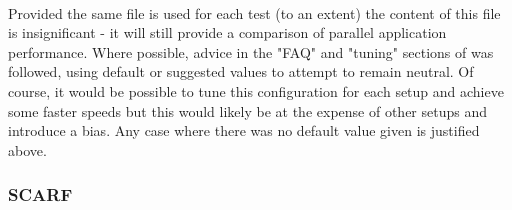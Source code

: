 \documentclass{article}
\begin{document}
            \paragraph{}
            Provided the same file is used for each test (to an extent) the content of this file is insignificant - it will still provide a comparison of parallel application performance. Where possible, advice in the "FAQ" and "tuning" sections of \cite{hpl2016} was followed, using default or suggested values to attempt to remain neutral. Of course, it would be possible to tune this configuration for each setup and achieve some faster speeds but this would likely be at the expense of other setups and introduce a bias. Any case where there was no default value given is justified above.



        \subsubsection{SCARF}
        \label{running-HPL-SCARF}
\end{document}
